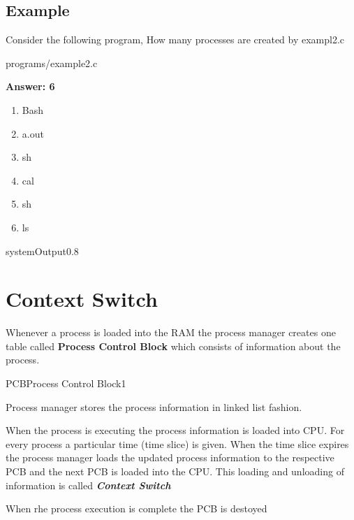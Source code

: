 \documentclass[11pt,fleqn]{book} %
\begin{document}
\subsection*{Example}

Consider the following program, How many processes are created by exampl2.c

\begin{mycode}{programs/example2.c}
\end{mycode}

\textbf{Answer: 6} 

\begin{enumerate}
	\item Bash
	\item a.out
	\item sh
	\item cal
	\item sh
	\item ls
\end{enumerate}

\begin{myfigure}{system}{Output}{0.8}
\end{myfigure}

\section{Context Switch}

Whenever a process is loaded into the RAM the process manager creates one table called \textbf{Process Control Block} which consists of information about the process.

\begin{myfigure}{PCB}{Process Control Block}{1}
\end{myfigure}

Process manager stores the process information in linked list fashion.

When the process is executing the process information is loaded into CPU. For every process a particular time (time slice) is given. When the time slice expires the process manager loads the updated process information to the respective PCB and the next PCB is loaded into the CPU.
\linebreak\linebreak
This loading and unloading of information is called \textbf{\textit{Context Switch}}

When rhe process execution is complete the PCB is destoyed
\end{document}
